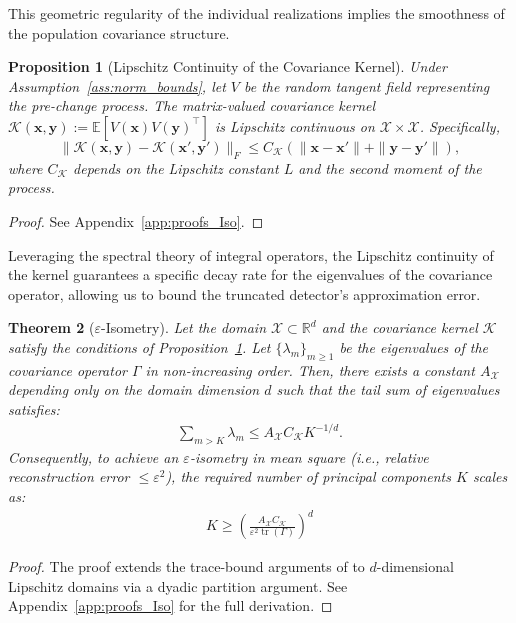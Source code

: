 \documentclass{article}
\newcommand{\ie}{\textit{i.e.}, \xspace}
\theoremstyle{plain}
\newtheorem{theorem}{Theorem}[section]
\newtheorem{proposition}[theorem]{Proposition}
\theoremstyle{definition}
\theoremstyle{remark}
\begin{document}
This geometric regularity of the individual realizations implies the smoothness of the population covariance structure.

\begin{proposition}[Lipschitz Continuity of the Covariance Kernel]\label{prop:kernel_lipschitz}
Under Assumption~\ref{ass:norm_bounds}, let $V$ be the random tangent field representing the pre-change process. 
The matrix-valued covariance kernel $\mathcal{K}(\bm{x}, \bm{y}) := \mathbb{E}[V(\bm{x})V(\bm{y})^\top]$ is Lipschitz continuous on $\mathcal{X} \times \mathcal{X}$. Specifically,
$$\|\mathcal{K}(\bm{x}, \bm{y}) - \mathcal{K}(\bm{x}', \bm{y}')\|_F \le C_{\mathcal{K}} (\|\bm{x}-\bm{x}'\| + \|\bm{y}-\bm{y}'\|),$$
where $C_{\mathcal{K}}$ depends on the Lipschitz constant $L$ and the second moment of the process.
\end{proposition}

\begin{proof}See Appendix~\ref{app:proofs_Iso}.
\end{proof}

Leveraging the spectral theory of integral operators, the Lipschitz continuity of the kernel guarantees a specific decay rate for the eigenvalues of the covariance operator, allowing us to bound the truncated detector's approximation error.
\begin{theorem}[$\varepsilon$-Isometry]\label{thm:holder-tail}Let the domain $\mathcal{X} \subset \mathbb{R}^d$ and the covariance kernel $\mathcal{K}$ satisfy the conditions of Proposition~\ref{prop:kernel_lipschitz}. 
Let $\{\lambda_m\}_{m\ge 1}$ be the eigenvalues of the covariance operator $\Gamma$ in non-increasing order.
Then, there exists a constant $A_{\mathcal{X}}$ depending only on the domain dimension $d$ such that the tail sum of eigenvalues satisfies:
\begin{align}\label{eq:tail_bound}
\sum_{m > K} \lambda_m \le A_{\mathcal{X}} C_{\mathcal{K}} K^{-1/d} .
\end{align}
Consequently, to achieve an $\varepsilon$-isometry in mean square (\ie relative reconstruction error $\le \varepsilon^2$), the required number of principal components $K$ scales as:
\begin{align}
    K \ge \left( \frac{A_{\mathcal{X}} C_{\mathcal{K}}}{\varepsilon^2 \operatorname{tr}(\Gamma)} \right)^d
\end{align}
\end{theorem}

\begin{proof}The proof extends the trace-bound arguments of \citet{reade1983eigen} to $d$-dimensional Lipschitz domains via a dyadic partition argument. 
See Appendix~\ref{app:proofs_Iso} for the full derivation.
\end{proof}
\end{document}
